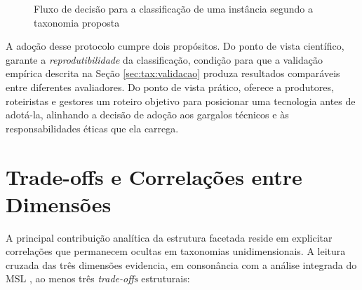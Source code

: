 \begin{figure}[htbp]
\centering
{}
\caption{Fluxo de decisão para a classificação de uma instância segundo a taxonomia proposta}
\label{fig:protocolo}
\end{figure}

A adoção desse protocolo cumpre dois propósitos. Do ponto de vista científico, garante a \textit{reprodutibilidade} da classificação, condição para que a validação empírica descrita na Seção \ref{sec:tax:validacao} produza resultados comparáveis entre diferentes avaliadores. Do ponto de vista prático, oferece a produtores, roteiristas e gestores um roteiro objetivo para posicionar uma tecnologia antes de adotá-la, alinhando a decisão de adoção aos gargalos técnicos e às responsabilidades éticas que ela carrega.

\section{Trade-offs e Correlações entre Dimensões}
\label{sec:tax:tradeoffs}

A principal contribuição analítica da estrutura facetada reside em explicitar correlações que permanecem ocultas em taxonomias unidimensionais. A leitura cruzada das três dimensões evidencia, em consonância com a análise integrada do MSL \citep{RothAleo2026}, ao menos três \textit{trade-offs} estruturais:

